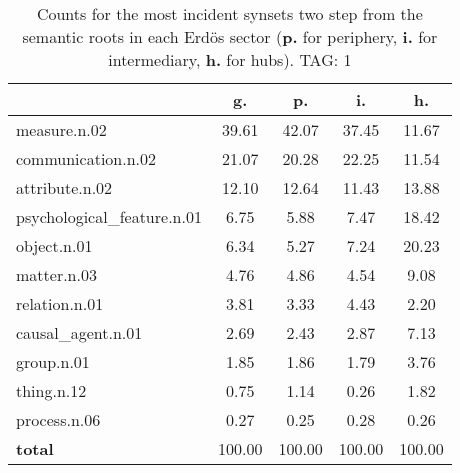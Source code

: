 \begin{table}[h!]
\begin{center}
\begin{tabular}{| l | c | c | c | c |}\hline
 & g. & p. & i. & h. \\\hline
measure.n.02 & 39.61  & 42.07  & 37.45  & 11.67 \\\hline
communication.n.02 & 21.07  & 20.28  & 22.25  & 11.54 \\\hline
attribute.n.02 & 12.10  & 12.64  & 11.43  & 13.88 \\\hline
psychological\_feature.n.01 & 6.75  & 5.88  & 7.47  & 18.42 \\\hline
object.n.01 & 6.34  & 5.27  & 7.24  & 20.23 \\\hline
matter.n.03 & 4.76  & 4.86  & 4.54  & 9.08 \\\hline
relation.n.01 & 3.81  & 3.33  & 4.43  & 2.20 \\\hline
causal\_agent.n.01 & 2.69  & 2.43  & 2.87  & 7.13 \\\hline
group.n.01 & 1.85  & 1.86  & 1.79  & 3.76 \\\hline
thing.n.12 & 0.75  & 1.14  & 0.26  & 1.82 \\\hline
process.n.06 & 0.27  & 0.25  & 0.28  & 0.26 \\\hline
{{\bf total}} & 100.00  & 100.00  & 100.00  & 100.00 \\\hline
\end{tabular}
\caption{Counts for the most incident synsets two step from the semantic roots in each Erd\"os sector ({\bf p.} for periphery, {\bf i.} for intermediary, {\bf h.} for hubs). TAG: 1}
\end{center}
\end{table}